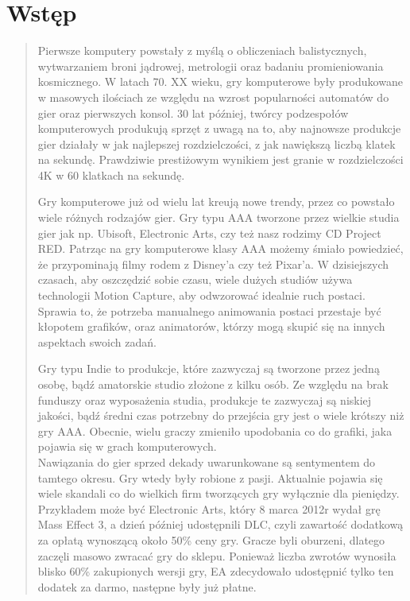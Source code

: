 \chapter{Wstęp}
\begin{quotation}
\indent Pierwsze komputery powstały z myślą o obliczeniach balistycznych, wytwarzaniem broni jądrowej, metrologii oraz badaniu promieniowania kosmicznego. W latach 70. XX wieku, gry komputerowe były produkowane w masowych ilościach ze względu na wzrost popularności automatów do gier oraz pierwszych konsol. 30 lat później, twórcy podzespołów komputerowych produkują sprzęt z uwagą na to, aby najnowsze produkcje gier działały w jak najlepszej rozdzielczości, z jak nawiększą liczbą klatek na sekundę. Prawdziwie prestiżowym wynikiem jest granie w rozdzielczości 4K w 60 klatkach na sekundę.

\indent Gry komputerowe już od wielu lat kreują nowe trendy, przez co powstało wiele różnych rodzajów gier. Gry typu AAA tworzone przez wielkie studia gier jak np. Ubisoft, Electronic Arts, czy też nasz rodzimy CD Project RED. Patrząc na gry komputerowe klasy AAA możemy śmiało powiedzieć, że przypominają filmy rodem z Disney'a czy też Pixar'a. W dzisiejszych czasach, aby oszczędzić sobie czasu, wiele dużych studiów używa technologii Motion Capture, aby odwzorować idealnie ruch postaci. Sprawia to, że potrzeba manualnego animowania postaci przestaje być kłopotem grafików, oraz animatorów, którzy mogą skupić się na innych aspektach swoich zadań.

\indent Gry typu Indie to produkcje, które zazwyczaj są tworzone przez jedną osobę, bądź amatorskie studio złożone z kilku osób. Ze względu na brak funduszy oraz wyposażenia studia, produkcje te zazwyczaj są niskiej jakości, bądź średni czas potrzebny do przejścia gry jest o wiele krótszy niż gry AAA. Obecnie, wielu graczy zmieniło upodobania co do grafiki, jaka pojawia się w grach komputerowych. \\
Nawiązania do gier sprzed dekady uwarunkowane są sentymentem do tamtego okresu. Gry wtedy były robione z pasji. Aktualnie pojawia się wiele skandali co do wielkich firm tworzących gry wyłącznie dla pieniędzy. Przykładem może być Electronic Arts, który 8 marca 2012r wydał grę Mass Effect 3, a dzień później udostępnili DLC, czyli zawartość dodatkową za opłatą wynoszącą około 50\% ceny gry. Gracze byli oburzeni, dlatego zaczęli masowo zwracać gry do sklepu. Ponieważ liczba zwrotów wynosiła blisko 60\% zakupionych wersji gry, EA zdecydowało udostępnić tylko ten dodatek za darmo, następne były już płatne.


\end{quotation}

